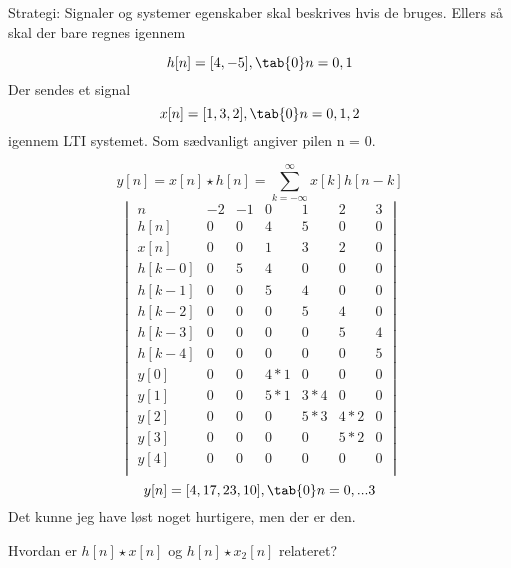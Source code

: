 \begin{rubrik}[Eksamenssæt 2021]
    Strategi:
        Signaler og systemer egenskaber skal beskrives hvis de bruges.
        Ellers så skal der bare regnes igennem
    \begin{eksamensOpgave}
        \[h[n] = [4, -5], \tab{0} n = 0, 1\]
        Der sendes et signal 
        \[x[n] = [1, 3, 2], \tab{0} n = 0, 1, 2\]
        igennem LTI systemet. Som sædvanligt angiver pilen n = 0.
        \begin{UnderOpgave}[Beregn \text{$y[n] = x[n] \star h[n]$} med "papir og blyant, hvis mellemregninger]
            \[y[n] = x[n] \star h[n] = \sum_{k = - \infty}^{\infty}{x[k]h[n - k]}\]
            \[\begin{vmatrix}%
                n        & -2 & -1 & 0   & 1   & 2   & 3 \\
                h[n]     &  0 &  0 & 4   & 5   & 0   & 0 \\
                x[n]     &  0 &  0 & 1   & 3   & 2   & 0 \\
                \hline
                h[k - 0] &  0 &  5 & 4   & 0   & 0   & 0 \\
                h[k - 1] &  0 &  0 & 5   & 4   & 0   & 0 \\
                h[k - 2] &  0 &  0 & 0   & 5   & 4   & 0 \\
                h[k - 3] &  0 &  0 & 0   & 0   & 5   & 4 \\
                h[k - 4] &  0 &  0 & 0   & 0   & 0   & 5 \\
                \hline
                y[0]     &  0 &  0 & 4*1 & 0   & 0   & 0 \\
                y[1]     &  0 &  0 & 5*1 & 3*4 & 0   & 0 \\  
                y[2]     &  0 &  0 & 0   & 5*3 & 4*2 & 0 \\
                y[3]     &  0 &  0 & 0   & 0   & 5*2 & 0 \\
                y[4]     &  0 &  0 & 0   & 0   & 0   & 0 \\
            \end{vmatrix}\]
            \[y[n] = [4, 17, 23, 10], \tab{0} n = 0, ... 3\]
            Det kunne jeg have løst noget hurtigere, men der er den. 
        \end{UnderOpgave}
        \begin{UnderOpgave}[Et andet signal er givet ved \text{$x_2[n] = 3x[n]$}]
            Hvordan er $h[n] \star x[n]$ og $h[n] \star x_2[n]$ relateret? 

\end{UnderOpgave}
\end{eksamensOpgave}
\end{rubrik}
